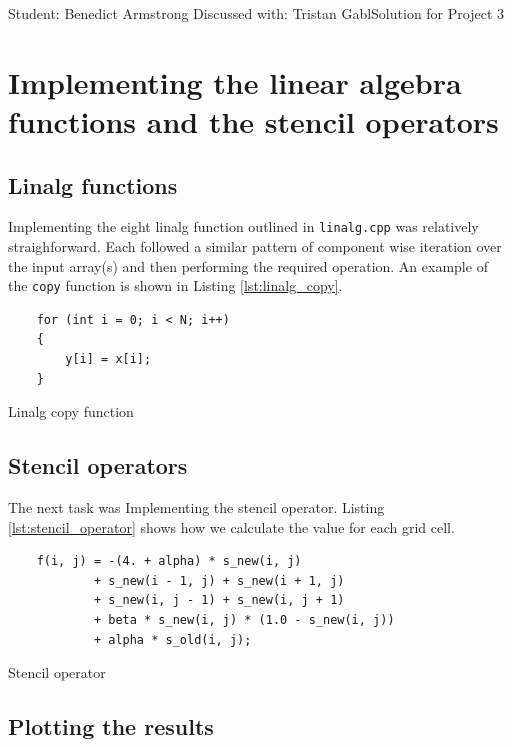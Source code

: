 \documentclass[unicode,11pt,a4paper,oneside,numbers=endperiod,openany]{scrartcl}
\begin{document}
\setassignment
{}

{Student: Benedict Armstrong}
{Discussed with: Tristan Gabl}{Solution for Project 3}{}
\newline


\section{Implementing the linear algebra functions and the stencil
  operators}

\subsection{Linalg functions}
Implementing the eight linalg function outlined in \texttt{linalg.cpp} was relatively straighforward. Each followed a similar pattern of component wise iteration over the input array(s) and then performing the required operation. An example of the \texttt{copy} function is shown in Listing \ref{lst:linalg_copy}.

\begin{listing}[h!t]
    \begin{verbatim}
    for (int i = 0; i < N; i++)
    {
        y[i] = x[i];
    }
    \end{verbatim}
    \caption{Linalg copy function}
    \label{lst:linalg_copy}
\end{listing}

\subsection{Stencil operators}

The next task was Implementing the stencil operator. Listing \ref{lst:stencil_operator} shows how we calculate the value for each grid cell.

\begin{listing}[h!t]
    \begin{verbatim}
    f(i, j) = -(4. + alpha) * s_new(i, j) 
            + s_new(i - 1, j) + s_new(i + 1, j) 
            + s_new(i, j - 1) + s_new(i, j + 1) 
            + beta * s_new(i, j) * (1.0 - s_new(i, j)) 
            + alpha * s_old(i, j);
    \end{verbatim}
    \caption{Stencil operator}
    \label{lst:stencil_operator}
\end{listing}

\subsection{Plotting the results}
\end{document}
